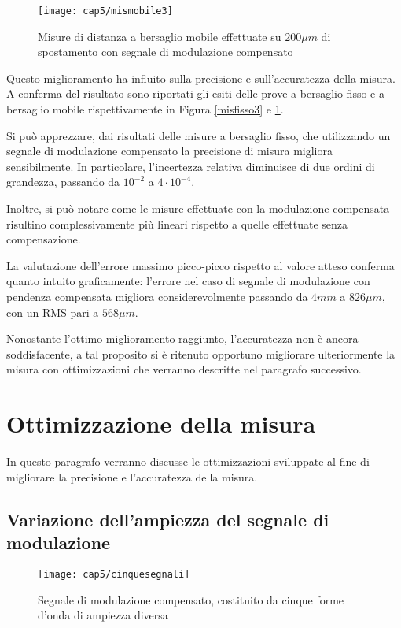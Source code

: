 \begin{figure}  
  \begin{center}
    \texttt{[image: cap5/mismobile3]}
    \caption{Misure di distanza a bersaglio mobile effettuate su $200\mu m$ di spostamento con segnale di modulazione compensato}
    \label{mismobile3}
  \end{center}
\end{figure}

Questo miglioramento ha influito sulla precisione e sull'accuratezza della misura. A conferma del risultato sono riportati gli esiti delle prove a bersaglio fisso e a bersaglio mobile rispettivamente in Figura \ref{misfisso3} e \ref{mismobile3}.

Si può apprezzare, dai risultati delle misure a bersaglio fisso, che utilizzando un segnale di modulazione compensato la precisione di misura migliora sensibilmente. In particolare, l'incertezza relativa diminuisce di due ordini di grandezza, passando da $10^{-2}$ a $4 \cdot 10^{-4}$.

Inoltre, si può notare come le misure effettuate con la modulazione compensata risultino complessivamente più lineari rispetto a quelle effettuate senza compensazione.

La valutazione dell'errore massimo picco-picco rispetto al valore atteso conferma quanto intuito graficamente: l'errore nel caso di segnale di modulazione con pendenza compensata migliora considerevolmente passando da $4mm$ a $826 \mu m$, con un RMS pari a $568 \mu m$.

Nonostante l'ottimo miglioramento raggiunto, l'accuratezza non è ancora soddisfacente, a tal proposito si è ritenuto opportuno migliorare ulteriormente la misura con ottimizzazioni che verranno descritte nel paragrafo successivo.

\section{Ottimizzazione della misura}
In questo paragrafo verranno discusse le ottimizzazioni sviluppate al fine di migliorare la precisione e l'accuratezza della misura.

\subsection{Variazione dell'ampiezza del segnale di modulazione}
\begin{figure}  
  \begin{center}
    \texttt{[image: cap5/cinquesegnali]}
    \caption{Segnale di modulazione compensato, costituito da cinque forme d'onda di ampiezza diversa}
    \label{cinquesegnali}
  \end{center}
\end{figure}


